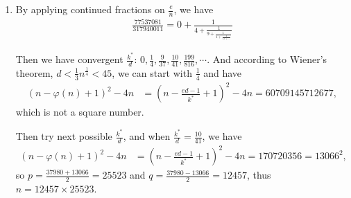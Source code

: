 \documentclass[a4paper,12pt]{journal}
\begin{document}
\begin{enumerate}
			\item By applying continued fractions on $\frac{e}{n}$, we have
			\begin{align*}
				\frac{77537081}{317940011} = 0 + \frac{1}{4 + \frac{1}{9 + \frac{1}{1 + \frac{1}{19 + \cdots}}}}
			\end{align*}
			\par Then we have convergent $\frac{k^{*}}{d}$: $0, \frac{1}{4}, \frac{9}{37}, \frac{10}{41}, \frac{199}{816},\cdots$. And according to Wiener's theorem, $d < \frac{1}{3}n^{\frac{1}{4}} < 45$, we can start with $\frac{1}{4}$ and have
			\begin{align*}
				(n - \varphi(n) + 1)^{2} - 4n &= (n - \frac{ed - 1}{k^{*}} + 1)^{2} - 4n = 60709145712677,
			\end{align*}
			which is not a square number.
			\par Then try next possible $\frac{k^{*}}{d}$, and when $\frac{k^{*}}{d} = \frac{10}{41}$, we have
			\begin{align*}
				(n - \varphi(n) + 1)^{2} - 4n &= (n - \frac{ed - 1}{k^{*}} + 1)^{2} - 4n = 170720356 = 13066^{2},
			\end{align*}
			so $p = \frac{37980 + 13066}{2} = 25523$ and $q = \frac{37980 - 13066}{2} = 12457$, thus $n = 12457 \times 25523$.
		\end{enumerate}
		
		
		
\end{document}
